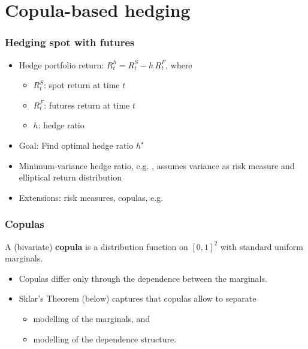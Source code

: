\documentclass[10pt,mathserif,notes=show]{beamer}
\renewcommand{\(}{\begin{columns}}
\renewcommand{\)}{\end{columns}}
\newcommand{\<}[1]{\begin{column}{#1}}
\renewcommand{\>}{\end{column}}
\theoremstyle{definition}
\begin{document}
\section{Copula-based hedging}

\begin{frame}
  \frametitle{Hedging spot with futures}
  \begin{itemize}
      \addtolength{\itemsep}{3pt}
  \item Hedge portfolio return: $R_t^h = R_t^S - h\, R_t^F$, where
    \begin{itemize}
      \addtolength{\itemsep}{3pt}
    \item $R_t^S$: spot return at time $t$
    \item $R_t^F$: futures return at time $t$
    \item $h$: hedge ratio
    \end{itemize}
  \item Goal: Find optimal hedge ratio $h^\star$
  \item Minimum-variance hedge ratio, e.g. \cite{Ederington1979},
    assumes variance as risk measure and elliptical return
    distribution 
  \item Extensions: risk measures, copulas, e.g.\
    \citep{Harris2006,Barbi2014} 
  \end{itemize}
\end{frame}

\begin{frame}
  \frametitle{Copulas}
  \begin{definition}
    A (bivariate) {\bf copula} is a distribution function on $[0,1]^2$
    with standard uniform marginals.
  \end{definition}
  \begin{itemize}
  \item Copulas differ only through the dependence between the
    marginals.
  \item Sklar's Theorem (below) captures that copulas allow to
    separate
    \begin{itemize}
    \item modelling of the marginals, and
    \item modelling of the dependence structure.
    \end{itemize}
  \end{itemize}
\end{frame}
\end{document}

